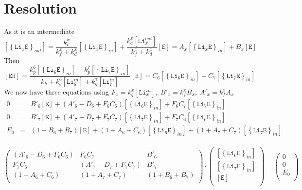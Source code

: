\documentclass[aps,onecolumn,11pt]{revtex4}
\newcommand{\mychem}[1]{\mathtt{#1}}
\newcommand{\myconc}[1]{\left\lbrack{#1}\right\rbrack}
\newcommand{\LiEin}[1]{\myconc{\left\lbrace\mychem{Li}_{#1}\mychem{E}\right\rbrace_{in}}}
\newcommand{\LiEout}[1]{\myconc{\left\lbrace\mychem{Li}_{#1}\mychem{E}\right\rbrace_{out}}}
\newcommand{\LiIn}[1]{\myconc{\mychem{Li}_{#1}^{in}}}
\newcommand{\LiOut}[1]{\myconc{\mychem{Li}_{#1}^{out}}}
\newcommand{\EHin}{\myconc{\mychem{EH}}}
\newcommand{\Eout}{\myconc{\mychem{E}}}
\newcommand{\Hin}{\myconc{\mychem{H}}}
\begin{document}
\section{Resolution}
As it is an intermediate
\begin{equation}
	\LiEout{x} = \dfrac{k_r^x}{k_f^x+k_d^x} \LiEin{x} + \dfrac{k_a^x\LiOut{x}}{k_f^x+k_d^x} \Eout
	= A_x  \LiEin{x} + B_x \Eout
\end{equation}
Then
\begin{equation}
\EHin = \dfrac{k_p^6 \LiEin{6} + k_p^7 \LiEin{7} }{k_h+k_q^6 \LiIn{6} + k_q^7 \LiIn{7} } \Hin
= C_6 \LiEin{6} + C_7 \LiEin{7}
\end{equation}
We now have three equations using $F_x=k_q^x\LiIn{x},\;B'_x=k_f^xB_x,\;A'_x=k_f^xA_x$
\begin{equation}
\begin{array}{rcl}
0   & = & B'_6 \Eout + \left(A'_6-D_6+F_6C_6\right) \LiEin{6} + F_6C_7 \LiEin{7} \\
0   & = & B'_7 \Eout + \left(A'_7-D_7+F_7C_7\right) \LiEin{7} + F_7C_6 \LiEin{6} \\
E_0 & = & \left(1+B_6+B_7\right)\Eout + \left(1+A_6+C_6\right) \LiEin{6} + \left(1+A_7+C_7\right) \LiEin{7}\\
\end{array}
\end{equation}

\begin{equation}
\begin{pmatrix}
\left(A'_6-D_6+F_6C_6\right) & F_6C_7 & B'_6\\
F_7C_6 & \left(A'_7-D_7+F_7C_7\right) & B'_7\\
\left(1+A_6+C_6\right) & \left(1+A_7+C_7\right) & \left(1+B_6+B_7\right)\\
\end{pmatrix}
\cdot
\begin{pmatrix}
	\LiEin{6}\\
	\LiEin{7}\\
	\Eout\\
\end{pmatrix} 
= 
\begin{pmatrix}
	0\\
	0\\
	E_0\\
\end{pmatrix}
\end{equation}
\end{document}

